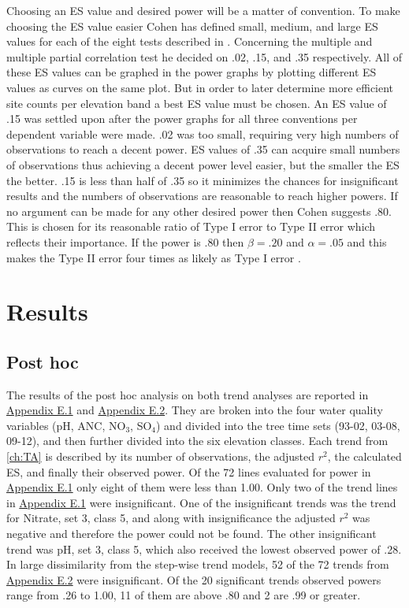 Choosing an ES value and desired power will be a matter of convention.
To make choosing the ES value easier Cohen has defined small, medium, and large ES values for each of the eight tests described in \citet{cohen1992power}.
Concerning the multiple and multiple partial correlation test he decided on .02, .15, and .35 respectively.
All of these ES values can be graphed in the power graphs by plotting different ES values as curves on the same plot.
But in order to later determine more efficient site counts per elevation band a best ES value must be chosen.
An ES value of .15 was settled upon after the power graphs for all three conventions per dependent variable were made.
.02 was too small, requiring very high numbers of observations to reach a decent power.
ES values of .35 can acquire small numbers of observations thus achieving a decent power level easier, but the smaller the ES the better.
.15 is less than half of .35 so it minimizes the chances for insignificant results and the numbers of observations are reasonable to reach higher powers.
If no argument can be made for any other desired power then Cohen suggests .80.
This is chosen for its reasonable ratio of Type I error to Type II error which reflects their importance.
If the power is .80 then $\beta=.20$ and $\alpha=.05$ and this makes the Type II error four times as likely as Type I error \citep{cohen1992statistical}.

\section{Results}

\subsection{Post hoc}

The results of the post hoc analysis on both trend analyses are reported in  \hyperref[sec:SWPHPA]{Appendix E.1} and \hyperref[sec:TVPHPA]{Appendix E.2}.
They are broken into the four water quality variables (pH, ANC, NO$_3$, SO$_4$) and divided into the tree time sets (93-02, 03-08, 09-12), and then further divided into the six elevation classes.
Each trend from \autoref{ch:TA} is described by its number of observations, the adjusted $r^2$, the calculated ES, and finally their observed power.
Of the 72 lines evaluated for power in \hyperref[sec:SWPHPA]{Appendix E.1} only eight of them were less than 1.00.
Only two of the trend lines in \hyperref[sec:SWPHPA]{Appendix E.1} were insignificant.
One of the insignificant trends was the trend for Nitrate, set 3, class 5, and along with insignificance the adjusted $r^2$ was negative and therefore the power could not be found.
The other insignificant trend was pH, set 3, class 5, which also received the lowest observed power of .28.
In large dissimilarity from the step-wise trend models, 52 of the 72 trends from \hyperref[sec:TVPHPA]{Appendix E.2} were insignificant.
Of the 20 significant trends observed powers range from .26 to 1.00, 11 of them are above .80 and 2 are .99 or greater.

